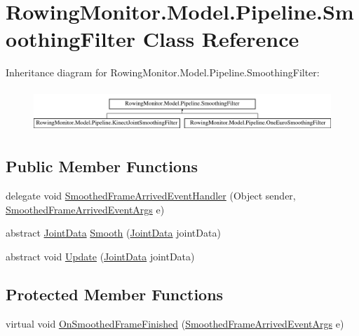 \hypertarget{class_rowing_monitor_1_1_model_1_1_pipeline_1_1_smoothing_filter}{}\section{Rowing\+Monitor.\+Model.\+Pipeline.\+Smoothing\+Filter Class Reference}
\label{class_rowing_monitor_1_1_model_1_1_pipeline_1_1_smoothing_filter}
Inheritance diagram for Rowing\+Monitor.\+Model.\+Pipeline.\+Smoothing\+Filter\+:\begin{figure}[H]
\begin{center}
\leavevmode
\includegraphics[height=1.623188cm]{class_rowing_monitor_1_1_model_1_1_pipeline_1_1_smoothing_filter}
\end{center}
\end{figure}
\subsection*{Public Member Functions}
\begin{DoxyCompactItemize}
\item 
delegate void \hyperlink{class_rowing_monitor_1_1_model_1_1_pipeline_1_1_smoothing_filter_af8a8a5758bd7a174033f698dcb1b93b2}{Smoothed\+Frame\+Arrived\+Event\+Handler} (Object sender, \hyperlink{class_rowing_monitor_1_1_model_1_1_smoothed_frame_arrived_event_args}{Smoothed\+Frame\+Arrived\+Event\+Args} e)
\item 
abstract \hyperlink{struct_rowing_monitor_1_1_model_1_1_util_1_1_joint_data}{Joint\+Data} \hyperlink{class_rowing_monitor_1_1_model_1_1_pipeline_1_1_smoothing_filter_a65ba6a5a48fbf5a51fb564dbeefc95fe}{Smooth} (\hyperlink{struct_rowing_monitor_1_1_model_1_1_util_1_1_joint_data}{Joint\+Data} joint\+Data)
\item 
abstract void \hyperlink{class_rowing_monitor_1_1_model_1_1_pipeline_1_1_smoothing_filter_a6f017782fee0747d4ece9ec3ffea6115}{Update} (\hyperlink{struct_rowing_monitor_1_1_model_1_1_util_1_1_joint_data}{Joint\+Data} joint\+Data)
\end{DoxyCompactItemize}
\subsection*{Protected Member Functions}
\begin{DoxyCompactItemize}
\item 
virtual void \hyperlink{class_rowing_monitor_1_1_model_1_1_pipeline_1_1_smoothing_filter_ac47b399ad4ae1ad899f5e571d6f6c05c}{On\+Smoothed\+Frame\+Finished} (\hyperlink{class_rowing_monitor_1_1_model_1_1_smoothed_frame_arrived_event_args}{Smoothed\+Frame\+Arrived\+Event\+Args} e)
\end{DoxyCompactItemize}
